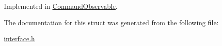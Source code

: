 Implemented in \hyperlink{class_command_observable_ad8bc68d264feb6c62ba2964e57c7c1ac}{Command\+Observable}.



The documentation for this struct was generated from the following file\+:\begin{DoxyCompactItemize}
\item 
\hyperlink{interface_8h}{interface.\+h}\end{DoxyCompactItemize}
